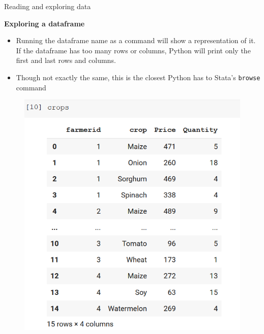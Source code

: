 \documentclass[aspectratio=169]{beamer}
\begin{document}
\begin{frame}{Reading and exploring data}

	\textbf{Exploring a dataframe}

	\begin{multicols}{2}

		\begin{itemize}
			\item Running the dataframe name as a command will show a representation of it. If the dataframe has too many rows or columns, Python will print only the first and last rows and columns.
			\item Though not exactly the same, this is the closest Python has to Stata's \texttt{browse} command
		\end{itemize}

		\begin{figure}
			\includegraphics[width=0.85\linewidth]{img/crops_df.png}
		\end{figure}

	\end{multicols}

\end{frame}
\end{document}
